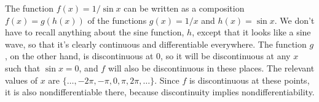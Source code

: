 The function $f(x)=1/\sin x$ can be written as a composition $f(x)=g(h(x))$ of the
functions $g(x)=1/x$ and $h(x)=\sin x$. We don't have to recall anything about
the sine function, $h$, except that it looks like a sine wave, so that it's clearly
continuous and differentiable everywhere. The function $g$, on the other hand,
is discontinuous at $0$, so it will be discontinuous at any $x$ such that
$\sin x=0$, and $f$ will also be discontinuous in these places. The relevant
values of $x$ are $\{\ldots, -2\pi, -\pi, 0, \pi, 2\pi, \ldots\}$.
Since $f$ is discontinuous at these points, it is also nondifferentiable there,
because discontinuity implies nondifferentiability.
